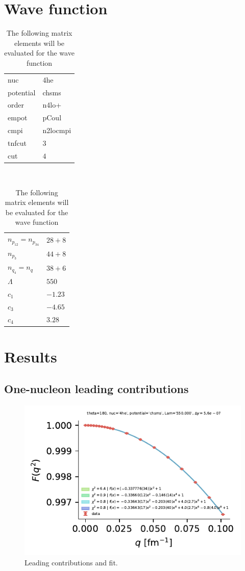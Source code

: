 \documentclass[onecolumn]{revtex4-2}
\begin{document}
\section{Wave function}
\begin{table}[htb!]
    \caption{The following matrix elements will be evaluated for the wave function}
    \label{}
    \begin{tabular}{ll}
    nuc       &       4he \\
    potential &     chsms \\
    order     &     n4lo+ \\
    empot     &     pCoul \\
    cmpi      &  n2locmpi \\
    tnfcut    &         $3$ \\
    cut       &        $4$\\
    \end{tabular}$\quad$
    \begin{tabular}{ll}
    $n_{p_{12}} = n_{p_{34}}$ &      $28+8$ \\
    $n_{p_{3}}$       &      $44+8$ \\
    $n_{q_4} = n_q$   &      $38+6$ \\
    $\Lambda$       &       $550$\\
    $c_1$        &  $-1.23$ \\
    $c_3$        &  $-4.65$ \\
    $c_4$        &  $3.28$
    \end{tabular}
\end{table}

\section{Results}

\subsection{One-nucleon leading contributions}
\begin{figure}[htb!]
    \includegraphics{figs/multi-poly-fit.pdf}
    \caption{Leading contributions and fit.}
    \label{}
\end{figure}
\end{document}

